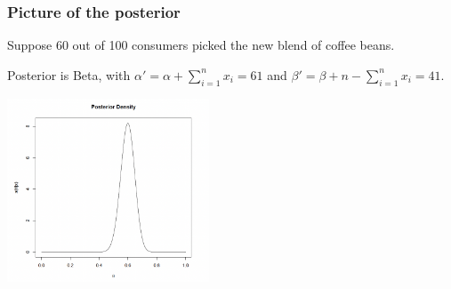 \documentclass[12pt]{beamer}
\begin{document}
\begin{frame}
	\frametitle{Picture of the posterior}
	
	Suppose 60 out of 100 consumers picked the new blend of coffee beans.
	
	Posterior is Beta, with $\alpha' = \alpha + \sum_{i=1}^n x_i = 61$ and 
	$\beta' = \beta + n - \sum_{i=1}^n x_i = 41$.
	
	\begin{center}
	\includegraphics[width=6cm]{post.png}
	\end{center}
	
\end{frame}
\end{document}
